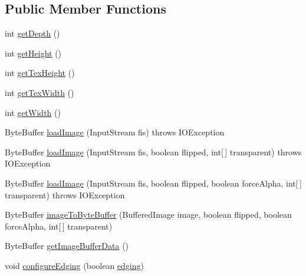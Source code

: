 \subsection*{Public Member Functions}
\begin{DoxyCompactItemize}
\item 
int \mbox{\hyperlink{classorg_1_1newdawn_1_1slick_1_1opengl_1_1_image_i_o_image_data_afd522d9f35ccf5827cdeb75eade55d6f}{get\+Depth}} ()
\item 
int \mbox{\hyperlink{classorg_1_1newdawn_1_1slick_1_1opengl_1_1_image_i_o_image_data_a9c15548c1f9ec6b5d591f44198c5722f}{get\+Height}} ()
\item 
int \mbox{\hyperlink{classorg_1_1newdawn_1_1slick_1_1opengl_1_1_image_i_o_image_data_a771cf308dff01137431513eb48497cd2}{get\+Tex\+Height}} ()
\item 
int \mbox{\hyperlink{classorg_1_1newdawn_1_1slick_1_1opengl_1_1_image_i_o_image_data_a54f08b337deb652cedaad3fe8dbe68da}{get\+Tex\+Width}} ()
\item 
int \mbox{\hyperlink{classorg_1_1newdawn_1_1slick_1_1opengl_1_1_image_i_o_image_data_accfdc9fa2f7b02f9291d996fa48a8f1f}{get\+Width}} ()
\item 
Byte\+Buffer \mbox{\hyperlink{classorg_1_1newdawn_1_1slick_1_1opengl_1_1_image_i_o_image_data_aa524a7c6717557a6ac60d1ac8b413950}{load\+Image}} (Input\+Stream fis)  throws I\+O\+Exception 
\item 
Byte\+Buffer \mbox{\hyperlink{classorg_1_1newdawn_1_1slick_1_1opengl_1_1_image_i_o_image_data_adfea90f9552b2fc504f28d0de7712ce1}{load\+Image}} (Input\+Stream fis, boolean flipped, int\mbox{[}$\,$\mbox{]} transparent)  throws I\+O\+Exception 
\item 
Byte\+Buffer \mbox{\hyperlink{classorg_1_1newdawn_1_1slick_1_1opengl_1_1_image_i_o_image_data_acd7d95d98f777ed7abff40dcb07d9d01}{load\+Image}} (Input\+Stream fis, boolean flipped, boolean force\+Alpha, int\mbox{[}$\,$\mbox{]} transparent)  throws I\+O\+Exception 
\item 
Byte\+Buffer \mbox{\hyperlink{classorg_1_1newdawn_1_1slick_1_1opengl_1_1_image_i_o_image_data_ac5ab7c2b917c07b09fa100784fc7b8d7}{image\+To\+Byte\+Buffer}} (Buffered\+Image image, boolean flipped, boolean force\+Alpha, int\mbox{[}$\,$\mbox{]} transparent)
\item 
Byte\+Buffer \mbox{\hyperlink{classorg_1_1newdawn_1_1slick_1_1opengl_1_1_image_i_o_image_data_a7856e0622b9fcfc5f8667ec4543ed8d0}{get\+Image\+Buffer\+Data}} ()
\item 
void \mbox{\hyperlink{classorg_1_1newdawn_1_1slick_1_1opengl_1_1_image_i_o_image_data_a6329973823fe6d99e2238530bac60a60}{configure\+Edging}} (boolean \mbox{\hyperlink{classorg_1_1newdawn_1_1slick_1_1opengl_1_1_image_i_o_image_data_ae93f5c7af2aa1995c55cd584bf5e9735}{edging}})
\end{DoxyCompactItemize}
